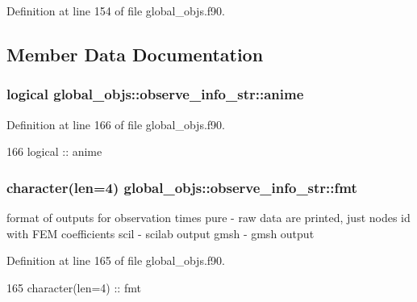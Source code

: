 Definition at line 154 of file global\+\_\+objs.\+f90.



\subsection{Member Data Documentation}
\subsubsection[{anime}]{\setlength{\rightskip}{0pt plus 5cm}logical global\+\_\+objs\+::observe\+\_\+info\+\_\+str\+::anime}\label{structglobal__objs_1_1observe__info__str_ac54eb8db3144177448c94b8621631365}


Definition at line 166 of file global\+\_\+objs.\+f90.


\begin{DoxyCode}
166     \textcolor{keywordtype}{logical} :: anime
\end{DoxyCode}
\subsubsection[{fmt}]{\setlength{\rightskip}{0pt plus 5cm}character(len=4) global\+\_\+objs\+::observe\+\_\+info\+\_\+str\+::fmt}\label{structglobal__objs_1_1observe__info__str_afb4e729384e7e0f833501abc9a66d15f}


format of outputs for observation times pure -\/ raw data are printed, just nodes id with F\+EM coefficients scil -\/ scilab output gmsh -\/ gmsh output 



Definition at line 165 of file global\+\_\+objs.\+f90.


\begin{DoxyCode}
165     \textcolor{keywordtype}{character(len=4)} :: fmt
\end{DoxyCode}

